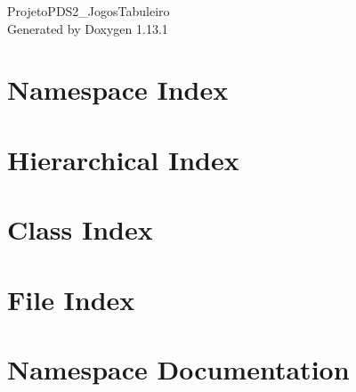 \documentclass[twoside]{book}
\newcommand{\+}{\discretionary{\mbox{\scriptsize$\hookleftarrow$}}{}{}}
\newcommand{\clearemptydoublepage}{%
    \newpage{\pagestyle{empty}\cleardoublepage}%
  }
\begin{document}
  \raggedbottom
    \hypersetup{pageanchor=false,
                bookmarksnumbered=true,
                pdfencoding=unicode
               }
  \begin{titlepage}
  \vspace*{7cm}
  \begin{center}%
  {\Large Projeto\+PDS2\+\_\+\+Jogos\+Tabuleiro}\\
  \vspace*{1cm}
  {\large Generated by Doxygen 1.13.1}\\
  \end{center}
  \end{titlepage}
  \clearemptydoublepage
  \tableofcontents
  \clearemptydoublepage
  \hypersetup{pageanchor=true}

\chapter{Namespace Index}

\chapter{Hierarchical Index}

\chapter{Class Index}

\chapter{File Index}

\chapter{Namespace Documentation}










\end{document}
